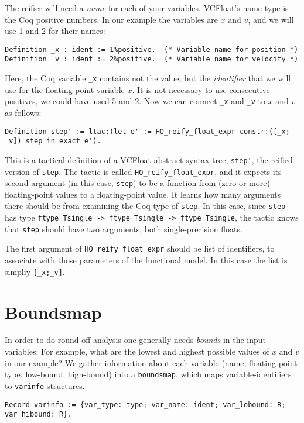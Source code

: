 \documentclass[article]{memoir}
\begin{document}
The reifier will need
a \emph{name} for each of your variables.
VCFloat's name type is the Coq positive numbers.
In our example the variables are $x$ and $v$, and
we will use 1 and 2 for their names:

\begin{lstlisting}
Definition _x : ident := 1%positive.  (* Variable name for position *)
Definition _v : ident := 2%positive.  (* Variable name for velocity *)
\end{lstlisting}

Here, the Coq variable \lstinline{_x} contains not the value,
but the \emph{identifier} that we will use for the floating-point
variable $x$.  It is not necessary to use consecutive positives,
we could have used 5 and 2.
Now we can connect \lstinline{_x} and
\lstinline{_v} to $x$ and $v$ as follows:

\begin{lstlisting}
Definition step' := ltac:(let e' := HO_reify_float_expr constr:([_x; _v]) step in exact e').
\end{lstlisting}

This is a tactical definition of a VCFloat abstract-syntax tree,
\lstinline{step'}, the reified version of \lstinline{step}.
The tactic is called \lstinline{HO_reify_float_expr},
and it expects its second argument (in this case, \lstinline{step})
to be a function from (zero or more) floating-point values
to a floating-point value.  It learns how many arguments
there should be from examining the Coq type of \lstinline{step}.
In this case, since \lstinline{step} has type
\lstinline{ftype Tsingle -> ftype Tsingle -> ftype Tsingle},
the tactic knows that \lstinline{step} should have
two arguments, both single-precision floats.

The first argument of \lstinline{HO_reify_float_expr}
should be list of identifiers, to associate with those
parameters of the functional model.  In this case the list is
simpliy \lstinline{[_x;_v]}.

\chapter{Boundsmap}

In order to do round-off analysis one generally needs \emph{bounds}
in the input variables:
For example, what are the lowest and highest possible
values of $x$ and $v$ in our example?
We gather information about each variable
(name, floating-point type, low-bound, high-bound) into
a \lstinline{boundsmap}, which maps variable-identifiers to
\lstinline{varinfo} structures.
\begin{lstlisting}
Record varinfo := {var_type: type; var_name: ident; var_lobound: R; var_hibound: R}.
\end{lstlisting}
\end{document}
